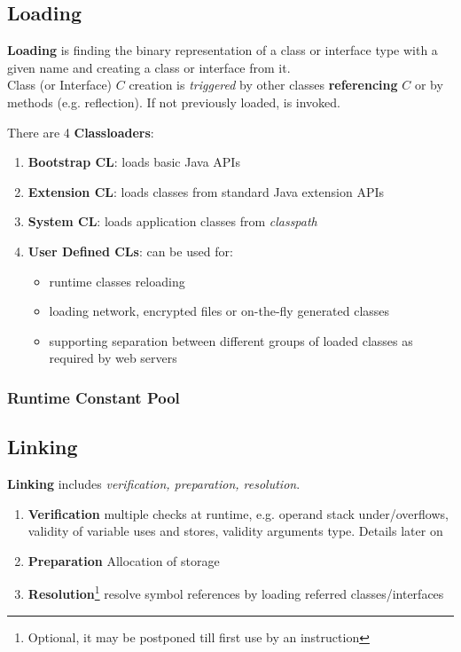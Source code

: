 \subsection{Loading}
\textbf{Loading} is finding the binary representation of a class or interface type with a given name and creating a class or interface from it.\\
Class (or Interface) $C$ creation is \textit{triggered} by other classes \textbf{referencing} $C$ or by methods (e.g. reflection).
If not previously loaded,  is invoked.
\nl

There are 4 \textbf{Classloaders}:
\begin{enumerate}
    \item \textbf{Bootstrap CL}: loads basic Java APIs
    \item \textbf{Extension CL}: loads classes from standard Java extension APIs
    \item \textbf{System CL}: loads application classes from \textit{classpath} 
    \item \textbf{User Defined CLs}: can be used for:
    \begin{itemize}
        \item runtime classes reloading
        \item loading network, encrypted files or on-the-fly generated classes
        \item supporting separation between different groups of loaded classes as required by web servers
    \end{itemize}
\end{enumerate}

\subsubsection{Runtime Constant Pool}

\subsection{Linking}
\textbf{Linking} includes \textit{verification, preparation, resolution}.
\begin{enumerate}
    \item \textbf{Verification} multiple checks at runtime, e.g. operand stack under/overflows, validity of variable uses and stores, validity arguments type.
    Details later on
    \item \textbf{Preparation} Allocation of storage 
    \item \textbf{Resolution}\footnote{Optional, it may be postponed till first use by an instruction} resolve symbol references by loading referred classes/interfaces
\end{enumerate}

